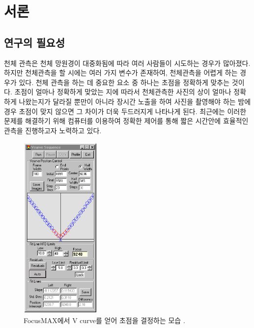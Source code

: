 \documentclass[twoside,11pt]{gshs_thesis}
\begin{document}
\cleardoublepage
\clearpage
\listoffigures	%

\cleardoublepage
\clearpage
\listoftables  %


\cleardoublepage
\clearpage
\renewcommand{\thepage}{\arabic{page}}
\setcounter{page}{1}



\section{서론}
\subsection{연구의 필요성}

천체 관측은 천체 망원경이 대중화됨에 따라 여러 사람들이 시도하는 경우가 많아졌다. 하지만 천체관측을 할 시에는 여러 가지 변수가 존재하여, 천체관측을 어렵게 하는 경우가 있다. 천체 관측을 하는 데 중요한 요소 중 하나는 초점을 정확하게 맞추는 것이다. 초점이 얼마나 정확하게 맞았는 지에 따라서 천체관측한 사진의 상이 얼마나 정확하게 나왔는지가 달라질 뿐만이 아니라 장시간 노출을 하여 사진을 촬영해야 하는 밤에 경우 초점이 맞지 않으면 그 차이가 더욱 두드러지게 나타나게 된다. 최근에는 이러한 문제를 해결하기 위해 컴퓨터를 이용하여 정확한 제어를 통해 짧은 시간안에 효율적인 관측을 진행하고자 노력하고 있다.

\begin{figure}[h]
	\begin{center}
		\includegraphics[width = 4cm]{V-curve}
	\end{center}
	\caption{FocusMAX에서 V curve를 얻어 초점을 결정하는 모습 \cite{weber2001fast}.}
	\label{V-curve}
\end{figure}
\end{document}
